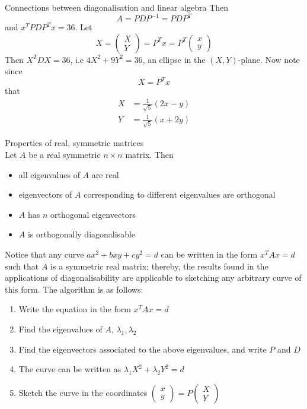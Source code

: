 \documentclass[journal, letterpaper]{IEEEtran}
\begin{document}
\begin{mybox}{Connections between diagonalisation and linear algebra}
        Then
        $$ A = PDP^{-1} = PDP^T$$
        and $x^TPDP^Tx = 36$. Let
        $$ X = \begin{pmatrix}
            X \\ Y
        \end{pmatrix} = P^Tx =  P^T\begin{pmatrix}
            x \\ y
        \end{pmatrix}$$
        Then $X^TDX = 36$, i.e $4X^2 + 9Y^2 = 36$, an ellipse in the $(X, Y)$-plane. 
        Now note since
        $$ X = P^Tx$$ that
        \begin{align*}
            X &= \frac{1}{\sqrt{5}}(2x - y) \\ 
            Y &= \frac{1}{\sqrt{5}}(x + 2y)
        \end{align*}
    \end{mybox}
    \begin{myboxr}{Properties of real, symmetric matrices} \\ 
        Let $A$ be a real symmetric $n \times n$ matrix. Then
        \begin{itemize}
            \item all eigenvalues of $A$ are real
            \item eigenvectors of $A$ corresponding to different eigenvalues are orthogonal
            \item $A$ has $n$ orthogonal eigenvectors 
            \item $A$ is orthogonally diagonalisable
        \end{itemize}
    \end{myboxr}
    Notice that any curve $ax^2 + bxy + cy^2 = d$ can be written in the form $x^TAx = d$ such that $A$ is a 
    symmetric real matrix; thereby, the results found in the applications of diagonalisability are applicable 
    to sketching any arbitrary curve of this form. The algorithm is as follows:
    \begin{enumerate}
        \item Write the equation in the form $x^TAx = d$
        \item Find the eigenvalues of $A$, $\lambda_1, \lambda_2$
        \item Find the eigenvectors associated to the above eigenvalues, and write $P$ and $D$
        \item The curve can be written as $\lambda_1X^2 + \lambda_2Y^2 = d$
        \item Sketch the curve in the coordinates $\begin{pmatrix}
            x \\ y
        \end{pmatrix} = P \begin{pmatrix}
            X \\ Y
        \end{pmatrix}$
    \end{enumerate}
\end{document}
